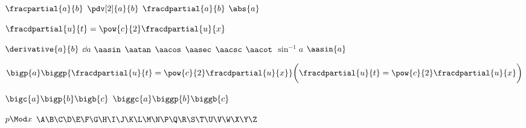 $\fracpartial{a}{b}$
$\pdv[2]{a}{b}$
$\fracdpartial{a}{b}$
$\abs{a}$

$\fracdpartial{u}{t} = \pow{c}{2} \fracdpartial{u}{x}$

$\derivative{a}{b}$
$\dd{a}$ 
$\aasin$
$\aatan$
$\aacos$
$\aasec$
$\aacsc$
$\aacot$
\newp
$\sin^{-1}a$
\newp
$\aasin{a}$


$\bigp{a} \biggp{\fracdpartial{u}{t} = \pow{c}{2} \fracdpartial{u}{x}} \biggl(\fracdpartial{u}{t} = \pow{c}{2} \fracdpartial{u}{x}\biggr)$

$\bigc{a} \bigp{b} \bigb{c}$
$\biggc{a} \biggp{b} \biggb{c}$

\restartequation


$p\Mod x$
$\A \B \C \D \E \F \G \H \I \J \K \L \M \N \P \Q \R \S \T \U \V \W \X \Y \Z$